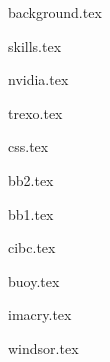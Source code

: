 \documentclass[11pt]{article}
\begin{document}
{background.tex}



{skills.tex}



{nvidia.tex}

\vspace{0.2cm}

{trexo.tex}

\vspace{0.2cm}

{css.tex}

\vspace{0.2cm}

{bb2.tex}

\vspace{0.2cm}

{bb1.tex}

\vspace{0.2cm}

{cibc.tex}


{buoy.tex}

\vspace{0.2cm}

{imacry.tex}


{windsor.tex}
\end{document}
